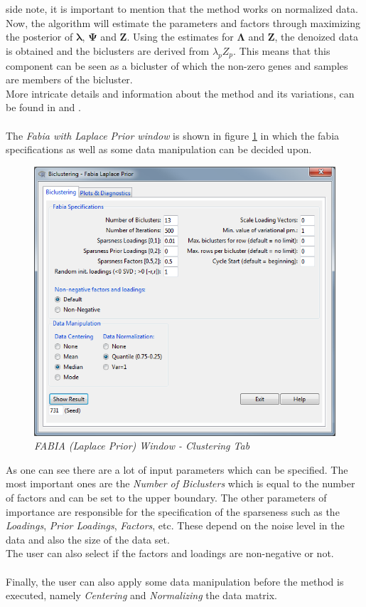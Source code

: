 \documentclass[a4paper]{article}\usepackage[]{graphicx}\usepackage[]{color}
\begin{document}
side note, it is important to mention that the method works on normalized data.
Now, the algorithm will estimate the parameters and factors through maximizing
the posterior of $\boldsymbol\lambda$, $\boldsymbol\Psi$ and $\mathbf{Z}$. Using
the estimates for $\boldsymbol\Lambda$ and $\mathbf{Z}$, the denoized data is
obtained and the biclusters are derived from $\lambda_p Z_p$. This means that
this component can be seen as a bicluster of which the non-zero genes and
samples are members of the bicluster. \\
More intricate details and information about the method and its variations, can
be found in \citet{Hochreiter2010} and \citet{Hochreiter2014a}.
\\ \\
The {\it Fabia with Laplace Prior window} is shown in figure
\ref{fabialaplace_clusttab} in which the fabia specifications as well as some
data manipulation can be decided upon.
\begin{figure}[H]
\centering
\includegraphics[scale=0.5]{figures/fabialaplace_clusttab.png}
\caption{{\it FABIA (Laplace Prior) Window - Clustering
Tab}\label{fabialaplace_clusttab}}
\end{figure}
\noindent As one can see there are a lot of input parameters which can be
specified. The most important ones are the {\it Number of Biclusters} which is
equal to the number of factors and can be set to the upper boundary. The other
parameters of importance are responsible for the specification of the sparseness
such as the {\it Loadings}, {\it Prior Loadings}, {\it Factors}, etc. These
depend on the noise level in the data and also the size of the data set.\\
The user can also select if the factors and loadings are non-negative
or not. 
\\ \\
Finally, the user can also apply some data manipulation before the method is
executed, namely {\it Centering} and {\it Normalizing} the data matrix.
\end{document}
